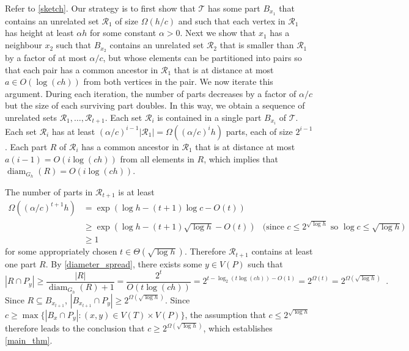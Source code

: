 \documentclass{patmorin}
\DeclareMathOperator{\diam}{diam}
\renewcommand{\le}{\leqslant}
\renewcommand{\ge}{\geqslant}
\begin{document}
Refer to \cref{sketch}.
Our strategy is to first show that $\mathcal{T}$ has some part $B_{x_1}$ that contains an unrelated set $\mathcal{R}_1$ of size $\Omega(h/c)$ and such that each vertex in $\mathcal{R}_1$ has height at least $\alpha h$ for some constant $\alpha>0$.  Next we show that $x_1$ has a neighbour $x_2$ such that $B_{x_2}$ contains an unrelated set $\mathcal{R}_2$ that is smaller than $\mathcal{R}_1$ by a factor of at most $\alpha/c$, but whose elements can be partitioned into pairs so that each pair has a common ancestor in $\mathcal{R}_1$ that is at distance at most $a\in O(\log(ch))$ from both vertices in the pair.  We now iterate this argument.  During each iteration, the number of parts decreases by a factor of $\alpha/c$ but the size of each surviving part doubles.  In this way, we obtain a sequence of unrelated sets $\mathcal{R}_1,\ldots,\mathcal{R}_{t+1}$. Each set $\mathcal{R}_i$ is contained in a single part $B_{x_i}$ of $\mathcal{T}$.  Each set $\mathcal{R}_i$ has at least $(\alpha/c)^{i-1}|\mathcal{R}_1|=\Omega((\alpha/c)^{i} h)$ parts, each of size $2^{i-1}$.   Each part $R$ of $\mathcal{R}_i$ has a common ancestor in $\mathcal{R}_1$ that is at distance at most $a(i-1)=O(i\log(ch))$ from all elements in $R$, which implies that $\diam_{G_h}(R)=O(i\log(ch))$.

The number of parts in $\mathcal{R}_{t+1}$ is at least
\begin{align*}
  \Omega((\alpha/c)^{t+1} h)
  & = \exp(\log h - (t+1)\log c - O(t)) \\
  & \ge \exp(\log h - (t+1)\sqrt{\log h} - O(t))
    & \text{(since $c\le 2^{\sqrt{\log h}}$ so $\log c\le \sqrt{\log h}$)} \\
  & \ge 1
\end{align*}
for some appropriately chosen $t\in \Theta(\sqrt{\log h})$.  Therefore $\mathcal{R}_{t+1}$ contains at least one part $R$. By \cref{diameter_spread}, there exists some $y \in V(P)$ such that
\[
  |R\cap P_y| \ge \frac{|R|}{\diam_{G_h}(R)+1} = \frac{2^t}{O(t\log(ch))}
  = 2^{t-\log_2(t\log(ch))-O(1)} = 2^{\Omega(t)} = 2^{\Omega(\sqrt{\log h})} \enspace .
\]
Since $R\subseteq B_{x_{t+1}}$, $|B_{x_{t+1}}\cap P_y|\ge 2^{\Omega(\sqrt{\log h})}$.  Since $c\ge \max\{|B_x\cap P_y|:(x,y)\in V(T)\times V(P)\}$, the assumption that $c\le 2^{\sqrt{\log h}}$ therefore leads to the conclusion that $c\ge 2^{\Omega(\sqrt{\log h})}$, which establishes \cref{main_thm}.
\end{document}
